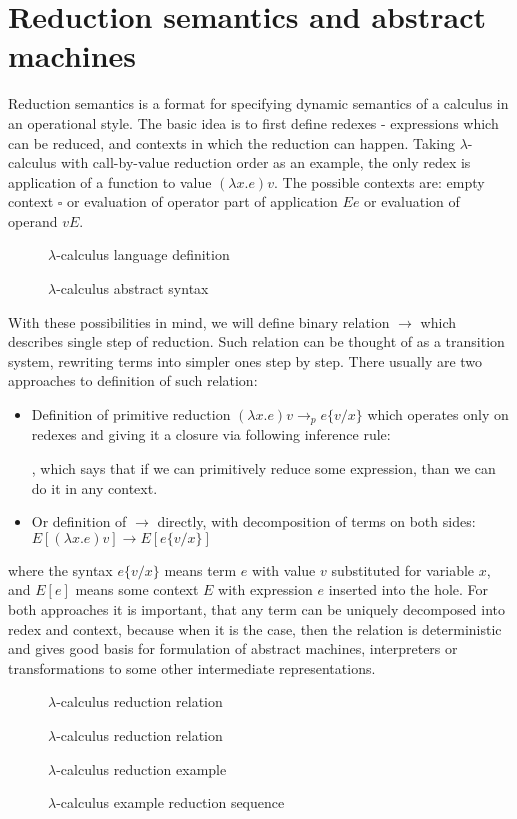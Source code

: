\documentclass[inz, english, shortabstract]{iithesis}
\newcommand{\LC}{\(\lambda\)-calculus }
\begin{document}
\section{Reduction semantics and abstract machines}
Reduction semantics is a format for specifying dynamic semantics of a calculus in an operational style.
The basic idea is to first define redexes - expressions which can be reduced, and contexts in which the reduction can happen.
Taking \LC with call-by-value reduction order as an example, the only redex is application of a function to value $ (\lambda x . e) v $.
The possible contexts are: empty context $ \square $ or evaluation of operator part of application $ E e $ or evaluation of operand $ v E $.
\begin{figure}
  \LC language definition  
  \caption{\LC abstract syntax}
  \label{fig:lc-lang}
\end{figure}
With these possibilities in mind, we will define binary relation $ \longrightarrow $ which describes single step of reduction.
Such relation can be thought of as a transition system, rewriting terms into simpler ones step by step.
There usually are two approaches to definition of such relation:
\begin{itemize}
  \item Definition of primitive reduction $ (\lambda x . e) v \longrightarrow_p e\{v/x\} $ which operates only on redexes and giving it a closure via following inference rule:
  \begin{prooftree}
  \end{prooftree},
  which says that if we can primitively reduce some expression, than we can do it in any context.
  \item Or definition of $ \longrightarrow $ directly, with decomposition of terms on both sides: $ E[(\lambda x . e) v] \longrightarrow E[e\{v/x\}] $
\end{itemize}
where the syntax $ e\{v/x\} $ means term $ e $ with value $ v $ substituted for variable $ x $, and $ E[e] $ means some context $ E $ with expression $ e $ inserted into the hole.
For both approaches it is important, that any term can be uniquely decomposed into redex and context, because when it is the case, then the relation is deterministic and gives good basis for formulation of abstract machines, interpreters or transformations to some other intermediate representations.
\begin{figure}
  \LC reduction relation
  \caption{\LC reduction relation}
  \label{fig:lc-red}
\end{figure}
\begin{figure}
  \LC reduction example
  \caption{\LC example reduction sequence}
  \label{fig:lc-red-example}
\end{figure}
\end{document}
